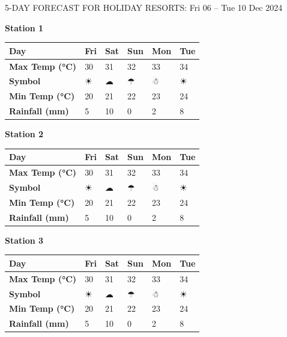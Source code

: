 
    \begin{frame}{5-DAY FORECAST FOR HOLIDAY RESORTS: Fri 06 – Tue 10 Dec 2024}
    \scriptsize
    
        \textbf{Station 1} \\
        \renewcommand{\arraystretch}{1.2} %
        \begin{tabular}{|p{2cm}|p{1.8cm}|p{1.8cm}|p{1.8cm}|p{1.8cm}|p{1.8cm}|}
        \hline
        \textbf{Day} & Fri & Sat & Sun & Mon & Tue \\ \hline
\textbf{Max Temp (°C)} & 30 & 31 & 32 & 33 & 34 \\ \hline
\textbf{Symbol} & ☀ & ☁ & ☂ & ☃ & ☀ \\ \hline
\textbf{Min Temp (°C)} & 20 & 21 & 22 & 23 & 24 \\ \hline
\textbf{Rainfall (mm)} & 5 & 10 & 0 & 2 & 8 \\ \hline
        \end{tabular}
        \vspace{0.5cm} %
        
        \textbf{Station 2} \\
        \renewcommand{\arraystretch}{1.2} %
        \begin{tabular}{|p{2cm}|p{1.8cm}|p{1.8cm}|p{1.8cm}|p{1.8cm}|p{1.8cm}|}
        \hline
        \textbf{Day} & Fri & Sat & Sun & Mon & Tue \\ \hline
\textbf{Max Temp (°C)} & 30 & 31 & 32 & 33 & 34 \\ \hline
\textbf{Symbol} & ☀ & ☁ & ☂ & ☃ & ☀ \\ \hline
\textbf{Min Temp (°C)} & 20 & 21 & 22 & 23 & 24 \\ \hline
\textbf{Rainfall (mm)} & 5 & 10 & 0 & 2 & 8 \\ \hline
        \end{tabular}
        \vspace{0.5cm} %
        
        \textbf{Station 3} \\
        \renewcommand{\arraystretch}{1.2} %
        \begin{tabular}{|p{2cm}|p{1.8cm}|p{1.8cm}|p{1.8cm}|p{1.8cm}|p{1.8cm}|}
        \hline
        \textbf{Day} & Fri & Sat & Sun & Mon & Tue \\ \hline
\textbf{Max Temp (°C)} & 30 & 31 & 32 & 33 & 34 \\ \hline
\textbf{Symbol} & ☀ & ☁ & ☂ & ☃ & ☀ \\ \hline
\textbf{Min Temp (°C)} & 20 & 21 & 22 & 23 & 24 \\ \hline
\textbf{Rainfall (mm)} & 5 & 10 & 0 & 2 & 8 \\ \hline
        \end{tabular}
        \vspace{0.5cm} %
        

\end{frame}
